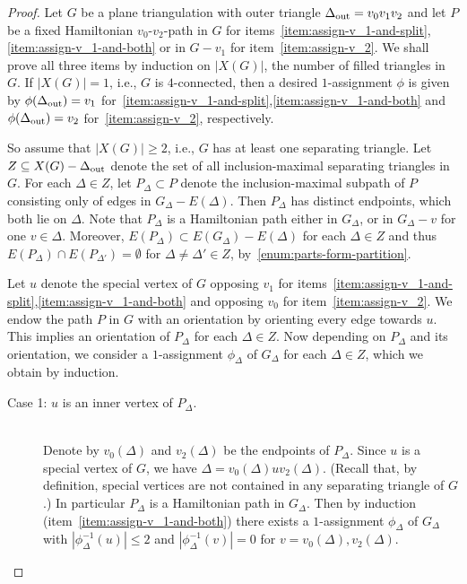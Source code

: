 \documentclass[a4paper,10pt]{article}
\theoremstyle{plain}
\begin{document}
\begin{proof}
 Let $G$ be a plane triangulation with outer triangle $\Delta_{\rm out} = v_0v_1v_2$ and let $P$ be a fixed Hamiltonian $v_0$-$v_2$-path in $G$ for items~\ref{item:assign-v_1-and-split},\ref{item:assign-v_1-and-both} or in $G-v_1$ for item~\ref{item:assign-v_2}.
 We shall prove all three items by induction on $|X(G)|$, the number of filled triangles in $G$.
 If $|X(G)| = 1$, i.e., $G$ is $4$-connected, then a desired $1$-assignment $\phi$ is given by $\phi(\Delta_{\rm out}) = v_1$ for~\ref{item:assign-v_1-and-split},\ref{item:assign-v_1-and-both} and $\phi(\Delta_{\rm out}) = v_2$ for~\ref{item:assign-v_2}, respectively.
 
 So assume that $|X(G)| \geq 2$, i.e., $G$ has at least one separating triangle.
 Let $Z \subseteq X(G) - \Delta_{\rm out}$ denote the set of all inclusion-maximal separating triangles in $G$. 
 For each $\Delta \in Z$, let $P_\Delta \subset P$ denote the inclusion-maximal subpath of $P$ consisting only of edges in $G_\Delta - E(\Delta)$.
 Then $P_\Delta$ has distinct endpoints, which both lie on $\Delta$.
 Note that $P_\Delta$ is a Hamiltonian path either in $G_\Delta$, or in $G_\Delta - v$ for one $v \in \Delta$.
 Moreover, $E(P_\Delta) \subset E(G_\Delta) - E(\Delta)$ for each $\Delta \in Z$ and thus $E(P_\Delta) \cap E(P_{\Delta'}) = \emptyset$ for $\Delta \neq \Delta' \in Z$, by~\ref{enum:parts-form-partition}.
 
 Let $u$ denote the special vertex of $G$ opposing $v_1$ for items~\ref{item:assign-v_1-and-split},\ref{item:assign-v_1-and-both} and opposing $v_0$ for item~\ref{item:assign-v_2}.
 We endow the path $P$ in $G$ with an orientation by orienting every edge towards $u$.
 This implies an orientation of $P_\Delta$ for each $\Delta \in Z$.
 Now depending on $P_\Delta$ and its orientation, we consider a $1$-assignment $\phi_\Delta$ of $G_\Delta$ for each $\Delta \in Z$, which we obtain by induction.
 
 \begin{description}
  \item[Case 1: $u$ is an inner vertex of $P_\Delta$.]{\ \\}
   Denote by $v_0(\Delta)$ and $v_2(\Delta)$ be the endpoints of $P_\Delta$.
   Since $u$ is a special vertex of $G$, we have $\Delta = v_0(\Delta)uv_2(\Delta)$.
   (Recall that, by definition, special vertices are not contained in any separating triangle of $G$.)
   In particular $P_\Delta$ is a Hamiltonian path in $G_\Delta$.
   Then by induction (item~\ref{item:assign-v_1-and-both}) there exists a $1$-assignment $\phi_\Delta$ of $G_\Delta$ with $|\phi_\Delta^{-1}(u)| \leq 2$ and $|\phi_\Delta^{-1}(v)| = 0$ for $v = v_0(\Delta),v_2(\Delta)$.
 

\end{description}
\end{proof}
\end{document}
